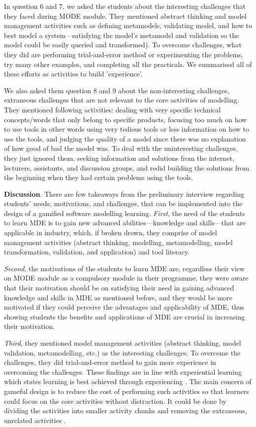 \documentclass[12pt, a4paper]{report}
\begin{document}
{In question 6 and 7, we asked the students about the interesting challenges that they faced during MODE module. They mentioned abstract thinking and model management activities such as defining metamodels, validating model, and how to best model a system---satisfying the model's metamodel and validation so the model could be easily queried and transformed). To overcome challenges, what they did are performing trial-and-error method or experimenting the problems, try many other examples, and completing all the practicals. We summarised all of these efforts as activities to build 'experience'.

We also asked them question 8 and 9 about the non-interesting challenges, extraneous challenges that are not relevant to the core activities of modelling. They mentioned following activities: dealing with very specific technical concepts/words that only belong to specific products, focusing too much on how to use tools in other words using very tedious tools or less information on how to use the tools, and judging the quality of a model since there was no explanation of how good of bad the model was. To deal with the uninteresting challenges, they just ignored them, seeking information and solutions from the internet, lecturers, assistants, and discussion groups, and redid building the solutions from the beginning when they had certain problems using the tools.

\textbf{Discussion}. There are few takeaways from the preliminary interview regarding students' needs, motivations, and challenges, that can be implemented into the design of a gamified software modelling learning. \textit{First}, the need of the students to learn MDE is to gain new advanced abilities---knowledge and skills---that are applicable in industry, which, if broken drown, they comprise of model management activities (abstract thinking, modelling, metamodelling, model transformation, validation, and application) and tool literacy. 

\textit{Second}, the motivations of the students to learn MDE are, regardless their view on MODE module as a compulsory module in their programme, they were aware that their motivation should be on satisfying their need in gaining advanced knowledge and skills in MDE as mentioned before, and they would be more motivated if they could perceive the advantages and applicability of MDE, thus showing students the benefits and applications of MDE are crucial in increasing their motivation.

\textit{Third}, they mentioned model management activities (abstract thinking, model validation, metamodelling, etc.) as the interesting challenges. To overcome the challenges, they did trial-and-error method to gain more experience in overcoming the challenges. These findings are in line with experiential learning which states learning is best achieved through experiencing \cite{kolb2014experiential}. The main concern of gameful design is to reduce the cost of performing such activities so that learners could focus on the core activities without distraction. It could be done by dividing the activities into smaller activity chunks and removing the extraneous, unrelated activities \cite{deterding2015lens}. 

}
\end{document}
